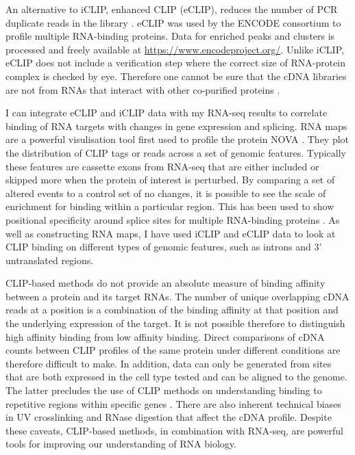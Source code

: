 An alternative to iCLIP, enhanced CLIP (eCLIP), reduces the number of PCR duplicate reads in the library  \citep{Van_Nostrand2016-su}. 
eCLIP was used by the ENCODE consortium to profile multiple RNA-binding proteins. 
Data for enriched peaks and clusters is processed and freely available at \url{https://www.encodeproject.org/}. 
Unlike iCLIP, eCLIP does not include a verification step where the correct size of RNA-protein complex is checked by eye.
Therefore one cannot be sure that the cDNA libraries are not from RNAs that interact with other co-purified proteins \citep{Chakrabarti2018}.

I can integrate eCLIP and iCLIP data with my RNA-seq results to correlate binding of RNA targets with changes in gene expression and splicing.
RNA maps are a powerful visulisation tool first used to profile the protein NOVA \citep{Ule2006}.
They plot the distribution of CLIP tags or reads across a set of genomic features.
Typically these features are cassette exons from RNA-seq that are either included or skipped more when the protein of interest is perturbed.
By comparing a set of altered events to a control set of no changes, it is possible to see the scale of enrichment for binding within a particular region. 
This has been used to show positional specificity around splice sites for multiple RNA-binding proteins \citep{Ule2006, Wang2010,Konig2010}.
As well as constructing RNA maps, I have used iCLIP and eCLIP data to look at CLIP binding on different types of genomic features, such as introns and 3' untranslated regions.

CLIP-based methods do not provide an absolute measure of binding affinity between a protein and its target RNAs. 
The number of unique overlapping cDNA reads at a position is a combination of the binding affinity at that position and the underlying expression of the target.
It is not possible therefore to distinguish high affinity binding from low affinity binding. 
Direct comparisons of cDNA counts between CLIP profiles of the same protein under different conditions are therefore difficult to make.
In addition, data can only be generated from sites that are both expressed in the cell type tested and can be aligned to the genome. 
The latter precludes the use of CLIP methods on understanding binding to repetitive regions within specific genes \citep{Chakrabarti2018}.
There are also inherent technical biases in UV crosslinking and RNase digestion that affect the cDNA profile.
Despite these caveats, CLIP-based methods, in combination with RNA-seq, are powerful tools for improving our understanding of RNA biology.

